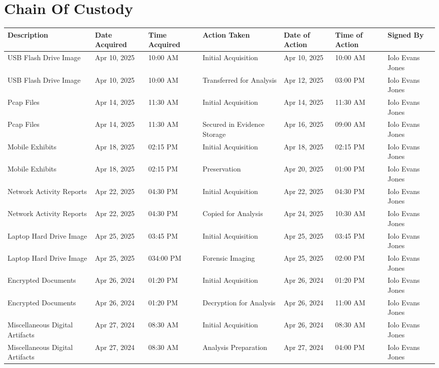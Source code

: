 
\chapter{Chain Of Custody}

\begin{longtable}{|p{2.5cm}|p{2cm}|p{2cm}|p{2.5cm}|p{2cm}|p{2cm}|p{2cm}|}
  \hline
  \textbf{Description} & \textbf{Date Acquired} & \textbf{Time Acquired} & \textbf{Action Taken} & \textbf{Date of Action} & \textbf{Time of Action} & \textbf{Signed By} \\
  \hline
  \endhead
  
  USB Flash Drive Image & Apr 10, 2025 & 10:00 AM & Initial Acquisition & Apr 10, 2025 & 10:00 AM & Iolo Evans Jones \\
  \hline
  USB Flash Drive Image & Apr 10, 2025 & 10:00 AM & Transferred for Analysis & Apr 12, 2025 & 03:00 PM & Iolo Evans Jones \\
  \hline
  Pcap Files & Apr 14, 2025 & 11:30 AM & Initial Acquisition & Apr 14, 2025 & 11:30 AM & Iolo Evans Jones \\
  \hline
  Pcap Files & Apr 14, 2025 & 11:30 AM & Secured in Evidence Storage & Apr 16, 2025 & 09:00 AM & Iolo Evans Jones \\
  \hline
  Mobile Exhibits & Apr 18, 2025 & 02:15 PM & Initial Acquisition & Apr 18, 2025 & 02:15 PM & Iolo Evans Jones \\
  \hline
  Mobile Exhibits & Apr 18, 2025 & 02:15 PM & Preservation & Apr 20, 2025 & 01:00 PM & Iolo Evans Jones \\
  \hline
  Network Activity Reports & Apr 22, 2025 & 04:30 PM & Initial Acquisition & Apr 22, 2025 & 04:30 PM & Iolo Evans Jones \\
  \hline
  Network Activity Reports & Apr 22, 2025 & 04:30 PM & Copied for Analysis & Apr 24, 2025 & 10:30 AM & Iolo Evans Jones \\
  \hline
  Laptop Hard Drive Image & Apr 25, 2025 & 03:45 PM & Initial Acquisition & Apr 25, 2025 & 03:45 PM & Iolo Evans Jones \\
  \hline
  Laptop Hard Drive Image & Apr 25, 2025 & 034:00 PM & Forensic Imaging & Apr 25, 2025 & 02:00 PM & Iolo Evans Jones \\
  \hline
  Encrypted Documents & Apr 26, 2024 & 01:20 PM & Initial Acquisition & Apr 26, 2024 & 01:20 PM & Iolo Evans Jones \\
  \hline
  Encrypted Documents & Apr 26, 2024 & 01:20 PM & Decryption for Analysis & Apr 26, 2024 & 11:00 AM & Iolo Evans Jones \\
  \hline
  Miscellaneous Digital Artifacts & Apr 27, 2024 & 08:30 AM & Initial Acquisition & Apr 26, 2024 & 08:30 AM & Iolo Evans Jones \\
  \hline
  Miscellaneous Digital Artifacts & Apr 27, 2024 & 08:30 AM & Analysis Preparation & Apr 27, 2024 & 04:00 PM & Iolo Evans Jones \\
  \hline
  \end{longtable}